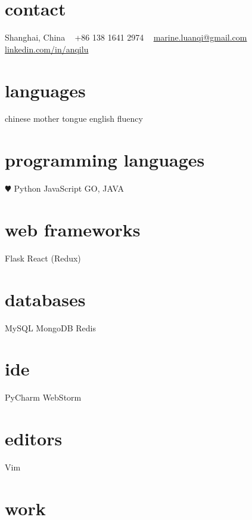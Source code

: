 \documentclass[]{friggeri-cv} %
\begin{document}


\begin{aside} %
\section{contact}
Shanghai, China
~
+86 138 1641 2974
~
\href{mailto:marine.luanqi@gmail.com}{marine.luanqi@gmail.com}
~
\href{https://www.linkedin.com/in/anqilu}{linkedin.com/in/anqilu}
\section{languages}
chinese mother tongue
english fluency
\section{programming languages}
{\color{red} $\varheartsuit$} Python
JavaScript
GO, JAVA
\section{web frameworks}
Flask
React (Redux)
\section{databases}
MySQL
MongoDB
Redis
\section{ide}
PyCharm
WebStorm
\section{editors}
Vim
\end{aside}

\section{work}
\end{document}

